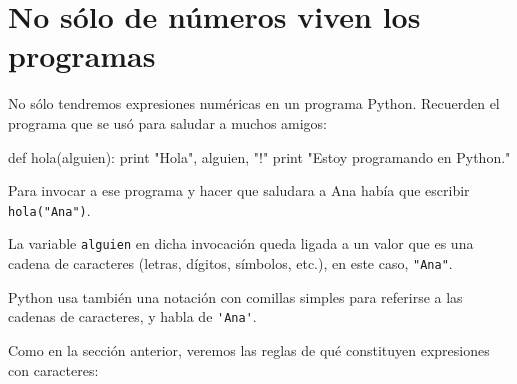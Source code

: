 \section{No sólo de números viven los programas} \label{nosolo}

No sólo tendremos expresiones numéricas en un programa Python.
Recuerden el programa que se usó para saludar a muchos amigos:

\begin{codigo-python-sn}
def hola(alguien):
    print "Hola", alguien, "!"
    print "Estoy programando en Python."
\end{codigo-python-sn}

Para invocar a ese programa y hacer que saludara a Ana había que
escribir \lstinline!hola("Ana")!.

La variable \lstinline!alguien! en dicha invocación queda ligada a un
valor que es una cadena de caracteres (letras, dígitos, símbolos,
etc.), en este caso, \lstinline!"Ana"!.

Python usa también una notación con comillas simples para referirse a las
cadenas de caracteres, y habla de \lstinline!'Ana'!.

Como en la sección anterior, veremos las reglas de qué constituyen
expresiones con caracteres:

